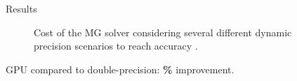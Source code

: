 \documentclass[hyperref={pdfpagelabels=false}]{beamer}
\begin{document}
\begin{frame}{Results}


\begin{figure}
    \caption{Cost of the MG solver considering several different dynamic
    precision scenarios to reach accuracy .}
    \label{fig.estimation1}
\end{figure}
 \vspace{-0.5cm}
 GPU compared to double-precision: \textbf{\%} improvement.

\end{frame}
\end{document}
